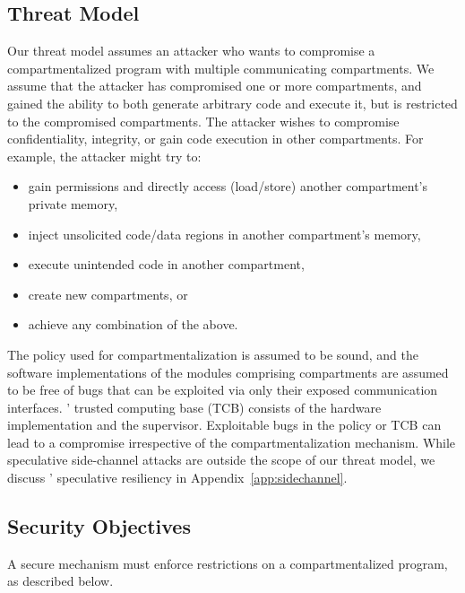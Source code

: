 \subsection{Threat Model}
\label{sec:reqs:threat}

Our threat model assumes an attacker who wants to compromise a 
compartmentalized program with multiple communicating compartments.
We assume that the attacker has compromised one or more compartments, and
gained the ability to both generate arbitrary code and execute it,
but is restricted to the compromised compartments.
The attacker wishes to compromise confidentiality, integrity, or 
gain code execution in other compartments.
%
For example, the attacker might try to:
\begin{itemize}
  \item gain permissions and directly access (load/store) 
        another compartment's private memory,
  \item inject unsolicited code/data regions in another 
        compartment's memory,
  \item execute unintended code in another compartment,
  \item create new compartments, or
  \item achieve any combination of the above.
\end{itemize}

The policy used for compartmentalization is assumed to be sound, and the software
implementations of the modules comprising compartments are assumed to be
free of bugs that can be exploited via only their exposed communication
interfaces.
\seccells' trusted computing base (TCB) consists of the hardware implementation
and the supervisor.
Exploitable bugs in the policy or TCB can lead to a compromise irrespective of the
compartmentalization mechanism.
While speculative side-channel attacks are outside the scope of our threat model,
we discuss \seccells' speculative resiliency in Appendix~\ref{app:sidechannel}.

\subsection{Security Objectives}
\label{sec:reqs:security}
A secure mechanism must enforce restrictions on a compartmentalized program,
as described below.

